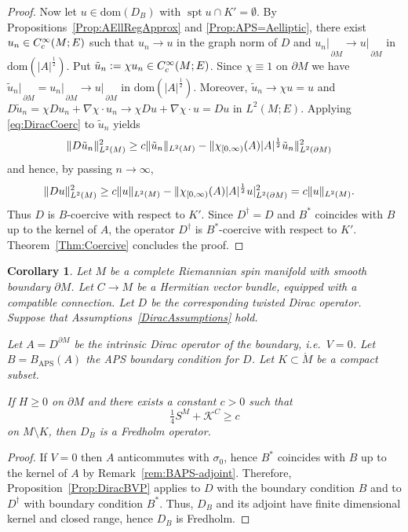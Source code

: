 \documentclass[a4paper,10pt,reqno]{amsart}
\newcommand{\rest}[1]{{{\lvert_{}}_{}}_{#1}}
\newcommand{\interior}[1]{\mathring{#1}}
\newcommand{\modulus}[1]{|#1|}
\newcommand{\Lp}[2][{}]{{\rm L}^{#2}_{\rm #1}}%
\newcommand{\Ck}[2][{}]{{\rm C}^{#2}_{\rm #1}}%
\newcommand{\dom}{\mathrm{dom}}
\newcommand{\KK}{\mathscr{K}}
\DeclareMathOperator{\spt}{spt}%
\newcommand{\APS}{\mathrm{APS}}
\newcommand{\dM}{\partial M}
\newtheorem{corollary}[theorem]{Corollary}
\theoremstyle{definition}
\begin{document}
\begin{proof}
Now let $u\in \dom(D_B)$ with $\spt u\cap K'=\emptyset$.
By Propositions~\ref{Prop:AEllRegApprox} and \ref{Prop:APS=Aelliptic}, there exist $u_n \in \Ck[c]{\infty}(M;E)$ such that $u_n \to u$ in the graph norm of $D$ and $u_n\rest{\dM} \to u\rest{\dM}$ in $\dom(\modulus{A}^{\frac12})$.
Put $\tilde{u}_n := \chi u_n\in\Ck[c]{\infty}(M;E)$.
Since $\chi\equiv 1$ on $\dM$ we have $\tilde{u}_n\rest{\dM} = u_n\rest{\dM} \to u\rest{\dM}$ in $\dom(\modulus{A}^{\frac12})$.
Moreover, $\tilde{u}_n \to \chi u = u$ and $D\tilde{u}_n = \chi D{u}_n + \nabla\chi\cdot {u}_n \to \chi D{u} + \nabla\chi\cdot {u} = Du$ in $L^2(M;E)$.
Applying \eqref{eq:DiracCoerc} to $\tilde{u}_n$ yields
\begin{align*}
\|D\tilde{u}_n\|_{\Lp{2}(M)}^2
 & \ge
c\|\tilde{u}_n\|_{\Lp{2}(M)} - \|\chi_{[0,\infty)}(A)|A|^{\frac12}\tilde{u}_n\|_{\Lp{2}(\dM)}^2
\end{align*}
and hence, by passing $n\to\infty$,
\begin{align*}
\|Du\|_{\Lp{2}(M)}^2
 & \ge
c\|u\|_{\Lp{2}(M)} - \|\chi_{[0,\infty)}(A)|A|^{\frac12}u|_{\Lp{2}(\dM)}^2
=
c\|u\|_{\Lp{2}(M)} .
\end{align*}
Thus $D$ is $B$-coercive with respect to $K'$.
Since $D^\dagger=D$ and $B^*$ coincides with $B$ up to the kernel of $A$, the operator $D^\dagger$ is $B^*$-coercive with respect to $K'$.
Theorem~\ref{Thm:Coercive} concludes the proof.
\end{proof}

\begin{corollary}
Let $M$ be a complete Riemannian spin manifold with smooth boundary $\dM$.
Let $C\to M$ be a Hermitian vector bundle, equipped with a compatible connection.
Let $D$ be the corresponding twisted Dirac operator.
Suppose that Assumptions~\ref{DiracAssumptions} hold.

Let $A=D^{\dM}$ be the intrinsic Dirac operator of the boundary, i.e.\ $V=0$.
Let $B=B_{\APS}(A)$ the APS boundary condition for $D$.
Let $K\subset \interior{M}$ be a compact subset.


If $H\ge0$ on $\dM$ and there exists a constant $c>0$ such that
$$
\tfrac14 S^M + \KK^C \ge c
$$
on $M\setminus K$, then $D_B$ is a Fredholm operator.
\end{corollary}

\begin{proof}
If $V=0$ then $A$ anticommutes with $\sigma_0$, hence $B^*$ coincides with $B$ up to the kernel of $A$ by Remark~\ref{rem:BAPS-adjoint}.
Therefore, Proposition~\ref{Prop:DiracBVP} applies to $D$ with the boundary condition $B$ and to $D^\dagger$ with boundary condition $B^*$.
Thus, $D_B$ and its adjoint have finite dimensional kernel and closed range, hence $D_B$ is Fredholm.
\end{proof}
\end{document}
